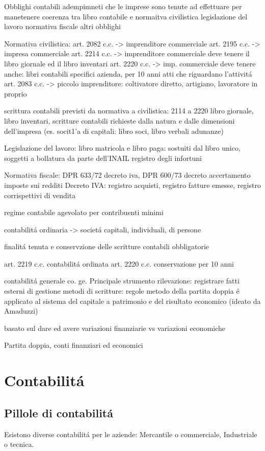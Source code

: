 \documentclass{article}
\begin{document}
Obblighi contabili
adempimneti che le imprese sono tenute ad effettuare per manetenere coerenza tra libro contabile e 
normaitva civilistica
legislazione del lavoro
normativa fiscale
altri obblighi

Normativa civilistica:
art. 2082 c.c. -> imprenditore commerciale
art. 2195 c.c. -> impresa commerciale
art. 2214 c.c. -> imprenditore commerciale deve tenere il libro giornale ed il libro inventari
art. 2220 c.c. -> imp. commerciale deve tenere anche: libri contabili specifici azienda, per 10 anni atti che riguardano l'attivit\'a
art. 2083 c.c. -> piccolo imprenditore: coltivatore diretto, artigiano, lavoratore in proprio

scrittura contabili previsti da normativa a civilistica: 2114 a 2220
libro giornale, libro inventari, scritture contabili richieste dalla natura e dalle dimensioni dell'impresa (es. socit1'a di capitali: libro soci, libro verbali adunanze)

Legislazione del lavoro: libro matricola e libro paga: sostuiti dal libro unico, soggetti a bollatura da parte dell'INAIL
registro degli infortuni

Normativa fiscale: 
DPR 633/72 decreto iva, DPR 600/73 decreto accertamento imposte sui redditi
Decreto IVA: registro acquisti, registro fatture emesse, registro corrispettivi di vendita

regime contabile agevolato per contribuenti minimi

contabilit\'a ordinaria -> societ\'a capitali, individuali, di persone

finalit\'a tenuta e conservzione delle scritture contabili obbligatorie

art. 2219 c.c. contabilit\'a ordinata
art. 2220 c.c. conservazione per 10 anni

contabilit\'a generale
co. ge.
Principale strumento rilevazione: registrare fatti esterni di gestione
metodi di scritture: regole
metodo della partita doppia \'e applicato al sistema del capitale a patrimonio e del risultato economico
(ideato da Amaduzzi)

basato sul dare ed avere
variazioni finanziarie vs variazioni economiche

Partita doppia, conti finanziari ed economici

\section{Contabilit\'a}
\subsection{Pillole di contabilit\'a}
Esistono diverse contabilit\'a per le aziende: Mercantile o commerciale, Industriale o tecnica.
\end{document}
